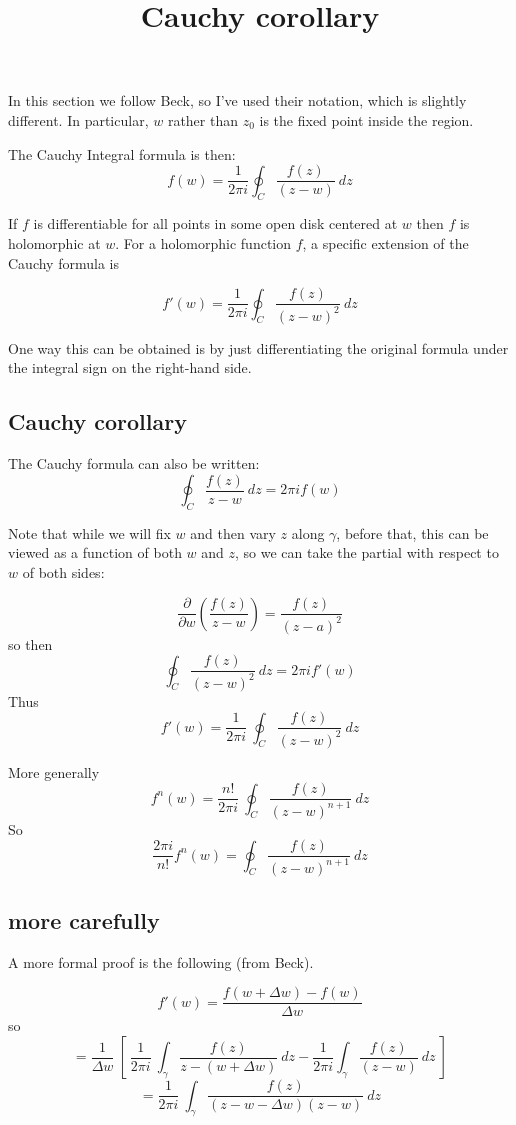 \documentclass[11pt, oneside]{article}
\title{Cauchy corollary}
\date{}
\begin{document}
\maketitle
\Large


In this section we follow Beck, so I've used their notation, which is slightly different.  In particular, $w$ rather than $z_0$ is the fixed point inside the region.

The Cauchy Integral formula is then:
\[ f(w) = \frac{1}{2 \pi i} \oint_C \frac{f(z)}{(z - w)} \ dz \]

If $f$ is differentiable for all points in some open disk centered at $w$ then $f$ is holomorphic at $w$.  For a holomorphic function $f$, a specific extension of the Cauchy formula is

\[ f'(w) = \frac{1}{2 \pi i} \oint_C \frac{f(z)}{(z - w)^2} \ dz \]

One way this can be obtained is by just differentiating the original formula under the integral sign on the right-hand side. 

\subsection*{Cauchy corollary}

The Cauchy formula can also be written:
\[ \oint_C \frac{f(z)}{z - w} \ dz = 2 \pi i f(w) \]

Note that while we will fix $w$ and then vary $z$ along $\gamma$, before that, this can be viewed as a function of both $w$ and $z$, so we can take the partial with respect to $w$ of both sides:

\[ \frac{\partial}{\partial w} ( \frac{f(z)}{z - w} ) = \frac{f(z)}{(z - a)^2} \]
so then
\[ \oint_C \frac{f(z)}{(z - w)^2} \ dz = 2 \pi i f'(w) \]
Thus
\[ f'(w) = \frac{1}{2 \pi i} \ \oint_C \frac{f(z)}{(z - w)^2} \ dz \]

More generally
\[ f^n(w) = \frac{n!}{2 \pi i} \ \oint_C \frac{f(z)}{(z - w)^{n+1}} \ dz \]
So
\[ \frac{2 \pi i}{n!} f^n(w) = \oint_C \frac{f(z)}{(z - w)^{n+1}} \ dz \]

\subsection*{more carefully} 

A more formal proof is the following (from Beck).

\[ f'(w) = \frac{f(w + \Delta w) - f(w)}{\Delta w} \]
so
\[ = \frac{1}{\Delta w} \ [ \ \frac{1}{2 \pi i} \ \int_{\gamma} \frac{f(z)}{z - (w + \Delta w)} \ dz - \frac{1}{2 \pi i} \int_{\gamma} \frac{f(z)}{(z - w)} \ dz \ ] \]
\[ =  \frac{1}{2 \pi i} \ \int_{\gamma} \frac{f(z)}{(z - w - \Delta w)(z-w)} \ dz  \]
\end{document}
